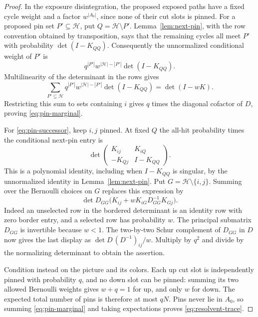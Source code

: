 \begin{proof}
In the exposure disintegration, the proposed exposed paths have a
fixed cycle weight and a factor $w^{|A_0|}$, since none of their cut
slots is pinned.  For a proposed pin set $P'\subseteq\mathcal H$,
put $Q=\mathcal H\setminus P'$.  Lemma~\ref{lem:next-pin}, with
the row convention obtained by transposition, says that the remaining
cycles all meet $P'$ with probability $\det(I-K_{QQ})$.  Consequently
the unnormalized conditional weight of $P'$ is
\begin{equation}\label{eq:conditional-soft-weight}
 q^{|P'|}w^{|\mathcal H|-|P'|}\det(I-K_{QQ}).
\end{equation}
Multilinearity of the determinant in the rows gives
\[
 \sum_{P'\subseteq\mathcal H}
 q^{|P'|}w^{|\mathcal H|-|P'|}\det(I-K_{QQ})=\det(I-wK).
\]
Restricting this sum to sets containing $i$ gives $q$ times the
diagonal cofactor of $D$, proving \eqref{eq:pin-marginal}.

For \eqref{eq:pin-successor}, keep $i,j$ pinned.  At fixed $Q$ the
all-hit probability times the conditional next-pin entry is
\[
 \det\begin{pmatrix}
 K_{ij}&K_{iQ}\\ -K_{Qj}&I-K_{QQ}
 \end{pmatrix}.
\]
This is a polynomial identity, including when $I-K_{QQ}$ is singular,
by the unnormalized identity in Lemma~\ref{lem:next-pin}.
Put $G=\mathcal H\setminus\{i,j\}$.  Summing over the Bernoulli
choices on $G$ replaces this expression by
\[
 \det D_{GG}\bigl(K_{ij}+wK_{iG}D_{GG}^{-1}K_{Gj}\bigr).
\]
Indeed an unselected row in the bordered determinant is an identity
row with zero border entry, and a selected row has probability $w$.
The principal submatrix $D_{GG}$ is invertible because $w<1$.
The two-by-two Schur complement of $D_{GG}$ in $D$ now gives the
last display as $\det D\,(D^{-1})_{ij}/w$.  Multiply by $q^2$
and divide by the normalizing determinant to obtain the assertion.

Condition instead on the picture and its colors.  Each up cut slot
is independently pinned with probability $q$, and no down slot can
be pinned: summing its two allowed Bernoulli weights gives $w+q=1$
for up, and only $w$ for down.  The expected total number of pins
is therefore at most $qN$.  Pins never lie in $A_0$, so summing
\eqref{eq:pin-marginal} and taking expectations proves
\eqref{eq:resolvent-trace}.


\end{proof}
